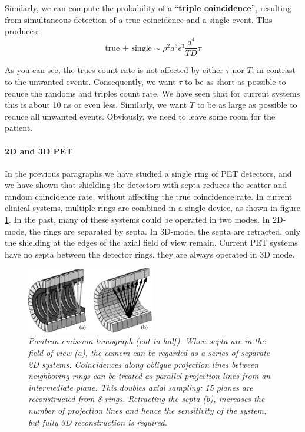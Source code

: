 \documentclass[11pt,oneside]{article}
\begin{document}
Similarly, we can compute the probability of a ``{\bf triple coincidence}'',
resulting from simultaneous detection of a true coincidence and a single
event. This produces:
\begin{equation}
  \mbox{true + single} \sim \rho^2 a^3 \epsilon^3 \frac{d^4}{TD} \tau
\end{equation}

As you can see, the trues count rate is not affected by either $\tau$
nor $T$, in contrast to the unwanted events. Consequently, we want
$\tau$ to be as short as possible to reduce the randoms and triples
count rate. We have seen that for current systems this is about 10 ns
or even less. Similarly, we want $T$ to be as large as possible to
reduce all unwanted events. Obviously, we need to leave some room for
the patient.


\paragraph{2D and 3D PET} \label{sec:2D3DPET}
In the previous paragraphs we have studied a single ring of PET
detectors, and we have shown that shielding the detectors with septa
reduces the scatter and random coincidence rate, without affecting the
true coincidence rate. In current clinical systems, multiple rings are
combined in a single device, as shown in figure \ref{fig:jnpet}. In
the past, many of these systems could be operated in two modes.  In
2D-mode, the rings are separated by septa. In 3D-mode, the septa are
retracted, only the shielding at the edges of the axial field of view
remain. Current PET systems have no septa between the detector rings,
they are always operated in 3D mode.

\begin{figure}[tb]
\centering
\includegraphics[width=0.5\textwidth]{figs/fig_jnpet.pdf}
\caption{\label{fig:jnpet} \emph{Positron emission tomograph (cut in
half). When septa are in the field of view (a), the camera can be regarded as
a series of separate 2D systems. Coincidences along oblique projection lines
between neighboring rings can be treated as parallel projection lines from an
intermediate plane. This doubles axial sampling: 15 planes are reconstructed
from 8 rings. Retracting the septa (b), increases the number of projection
lines and hence the sensitivity of the system, but fully 3D reconstruction is
required.}}
\end{figure}
\end{document}
